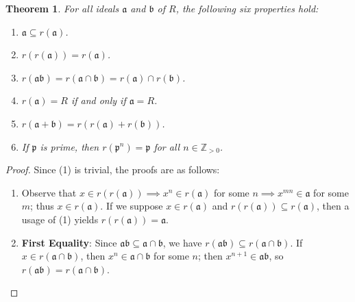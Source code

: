 \documentclass[11pt]{article}
\newtheorem{theorem}{Theorem}
\begin{document}
\begin{adjustwidth}{0.5cm}{}
	\begin{theorem}
		For all ideals $\mathfrak{a}$ and $\mathfrak{b}$ of $R$, the following six properties hold:
		\begin{enumerate}
			\item $\mathfrak{a} \subseteq r(\mathfrak{a})$.
			\item $r(r(\mathfrak{a})) = r(\mathfrak{a})$.
			\item $r(\mathfrak{a}\mathfrak{b}) = r(\mathfrak{a} \cap \mathfrak{b}) = r(\mathfrak{a}) \cap r(\mathfrak{b})$.
			\item $r(\mathfrak{a}) = R$ if and only if $\mathfrak{a} = R$.
			\item $r(\mathfrak{a} + \mathfrak{b}) = r(r(\mathfrak{a}) + r(\mathfrak{b}))$.
			\item If $\mathfrak{p}$ is prime, then $r(\mathfrak{p}^{n}) = \mathfrak{p}$ for all $n \in \mathbb{Z}_{> 0}$.
		\end{enumerate}
	\end{theorem}
	\begin{proof}
		Since (1) is trivial, the proofs are as follows:
		\begin{enumerate}\addtocounter{enumi}{1}
			\item Observe that $x \in r(r(\mathfrak{a})) \implies x^{n} \in r(\mathfrak{a})$ for some $n \implies x^{mn} \in \mathfrak{a}$ for some $m$; thus $x \in r(\mathfrak{a})$. If we suppose $x \in r(\mathfrak{a})$ and $r(r(\mathfrak{a})) \subseteq r(\mathfrak{a})$, then a usage of (1) yields $r(r(\mathfrak{a})) = \mathfrak{a}$.
			\item \textbf{First Equality}: Since $\mathfrak{ab} \subseteq \mathfrak{a} \cap \mathfrak{b}$, we have $r(\mathfrak{ab}) \subseteq r(\mathfrak{a} \cap \mathfrak{b})$. If $x \in r(\mathfrak{a} \cap \mathfrak{b})$, then $x^{n} \in \mathfrak{a} \cap \mathfrak{b}$ for some $n$; then $x^{n + 1} \in \mathfrak{a}\mathfrak{b}$, so $r(\mathfrak{ab}) = r(\mathfrak{a} \cap \mathfrak{b})$.


\end{enumerate}
\end{proof}
\end{adjustwidth}
\end{document}
